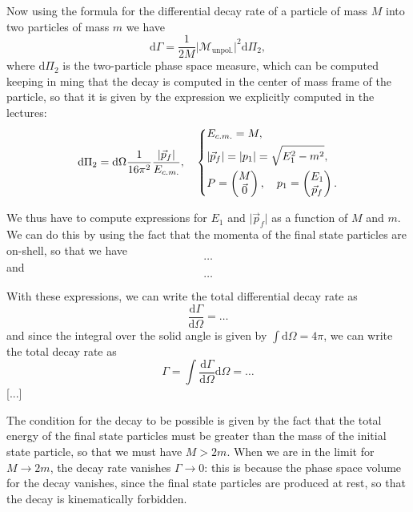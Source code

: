 Now using the formula for the differential decay rate of a particle of mass \(M\) into two particles of mass \(m\) we have
\[
    \mathrm{d} \Gamma = \frac{1}{2M} \vert \mathcal{M}_{\text{unpol.}} \vert^2 \mathrm{d} \Pi_2,
\]
where \(\mathrm{d} \Pi_2\) is the two-particle phase space measure, which can be computed keeping in ming that the decay is computed in the center of mass frame of the particle, so that it is given by the expression we explicitly computed in the lectures:
\[
    \mathrm{d} \Pi_2 = \mathrm{d} \Omega \frac{1}{16 \pi^2} \frac{\vert \vec{p}_f \vert}{E_{c.m.}}, \quad \begin{dcases}
        E_{c.m.} = M,                                                 \\
        \vert \vec{p}_f \vert = \vert p_1 \vert = \sqrt{E_1^2 - m^2}, \\
        P = \begin{pmatrix}
                M \\
                \vec{0}
            \end{pmatrix}, \quad p_1 = \begin{pmatrix}
                                           E_1 \\
                                           \vec{p}_f
                                       \end{pmatrix}.
    \end{dcases}
\]

We thus have to compute expressions for \(E_1\) and \(\vert \vec{p}_f \vert\) as a function of \(M\) and \(m\). We can do this by using the fact that the momenta of the final state particles are on-shell, so that we have
\[
    \dots
\]
and
\[
    \dots
\]

With these expressions, we can write the total differential decay rate as
\[
    \frac{\mathrm{d} \Gamma}{\mathrm{d} \Omega} = \dots
\]
and since the integral over the solid angle is given by \(\int \mathrm{d} \Omega = 4 \pi\), we can write the total decay rate as
\[
    \Gamma = \int \frac{\mathrm{d} \Gamma}{\mathrm{d} \Omega} \mathrm{d} \Omega = \dots
\]
[...]
\begin{remark}
    The condition for the decay to be possible is given by the fact that the total energy of the final state particles must be greater than the mass of the initial state particle, so that we must have \(M > 2m\). When we are in the limit for \(M \to 2m\), the decay rate vanishes \(\Gamma \to 0\): this is because the phase space volume for the decay vanishes, since the final state particles are produced at rest, so that the decay is kinematically forbidden.
\end{remark}

